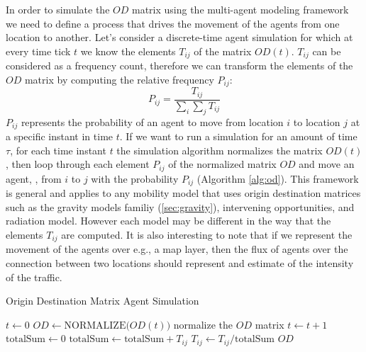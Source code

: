 In order to simulate the $OD$ matrix using the multi-agent modeling framework we need to define a process that drives the movement of the agents from one location to another. Let's consider a discrete-time agent simulation for which at every time tick $t$ we know the elements $T_{ij}$ of the matrix $OD(t)$. $T_{ij}$ can be considered as a frequency count, therefore we can transform the elements of the $OD$ matrix by computing the relative frequency $P_{ij}$:
\begin{displaymath}
P_{ij} = \frac{T_{ij}}{\sum_i \sum_j T_{ij}}
\end{displaymath}
$P_{ij}$ represents the probability of an agent to move from location $i$ to location $j$ at a specific instant in time $t$. If we want to run a simulation for an amount of time $\tau$, for each time instant $t$ the simulation algorithm normalizes the matrix $OD(t)$, then loop through each element $P_{ij}$ of the normalized matrix $OD$ and move an agent, , from $i$ to $j$ with the probability $P_{ij}$ (Algorithm \ref{alg:od}). This framework is general and applies to any mobility model that uses origin destination matrices such as the gravity models familiy (\sectionname\ref{sec:gravity}), intervening opportunities, and radiation model. However each model may be different in the way that the elements $T_{ij}$ are computed.
It is also interesting to note that if we represent the movement of the agents over e.g., a map layer, then the flux of agents over the connection between two locations should represent and estimate of the intensity of the traffic.

\begin{algorithm}
\caption{Origin Destination Matrix Agent Simulation}
\label{alg:od}
\begin{algorithmic}[1]
	\State $t \gets 0$
		\State $OD \gets \text{NORMALIZE($OD(t)$)}$	\Comment normalize the $OD$ matrix
            		\State {}
            	\EndIf
        	\EndFor
    	\EndFor
        \State $t \gets t + 1$
    \EndWhile
{}
	\State $\text{totalSum} \gets 0$
    		\State $\text{totalSum} \gets \text{totalSum} + T_{ij}$
        \EndFor
    \EndFor
    		\State $T_{ij} \gets T_{ij} / \text{totalSum}$
        \EndFor
    \EndFor
    \State \Return $OD$
\EndFunction
\end{algorithmic}
\end{algorithm}
